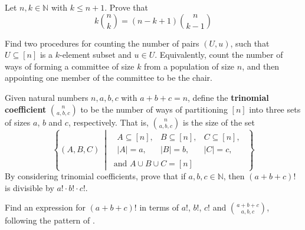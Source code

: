 \begin{exercise}
\label{exCountingKTimesNChooseK}
Let $n,k \in \mathbb{N}$ with $k \le n+1$. Prove that
\[ k \binom{n}{k} = (n-k+1) \binom{n}{k-1} \]
\begin{backhint}
Find two procedures for counting the number of pairs $(U, u)$, such that $U \subseteq [n]$ is a $k$-element subset and $u \in U$. Equivalently, count the number of ways of forming a committee of size $k$ from a population of size $n$, and then appointing one member of the committee to be the chair.
\end{backhint}
\end{exercise}


\begin{exercise}
\label{exTrinomialCoefficients}
Given natural numbers $n,a,b,c$ with $a+b+c=n$, define the \textbf{trinomial coefficient} $\displaystyle \binom{n}{a,b,c}$  to be the number of ways of partitioning $[n]$ into three sets of sizes $a$, $b$ and $c$, respectively. That is, $\displaystyle \binom{n}{a,b,c}$ is the size of the set
\[ \left\{ (A,B,C)\ \middle|\ 
\begin{matrix} \begin{matrix} A \subseteq [n], & B \subseteq [n], & C \subseteq[n], \\ |A|=a, & |B|=b, & |C|=c, \end{matrix} \\ \text{and } A \cup B \cup C = [n] \end{matrix} \right\} \]
By considering trinomial coefficients, prove that if $a,b,c \in \mathbb{N}$, then $(a+b+c)!$ is divisible by $a! \cdot b! \cdot c!$.
\begin{backhint}
Find an expression for $(a+b+c)!$ in terms of $a!$, $b!$, $c!$ and $\binom{a+b+c}{a,b,c}$, following the pattern of .
\end{backhint}
\end{exercise}
